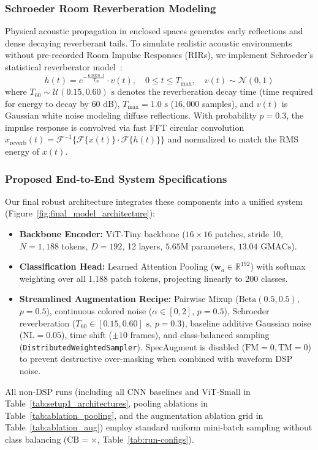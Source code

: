 \documentclass[11pt,a4paper]{article}
\begin{document}
\subsubsection{Schroeder Room Reverberation Modeling}
Physical acoustic propagation in enclosed spaces generates early reflections and dense decaying reverberant tails. To simulate realistic acoustic environments without pre-recorded Room Impulse Responses (RIRs), we implement Schroeder's statistical reverberator model~\cite{schroeder1962natural}:
\begin{equation}
    h(t) = e^{-\frac{6.9078 \cdot t}{T_{60}}} \cdot v(t), \quad 0 \le t \le T_{\text{max}}, \quad v(t) \sim \mathcal{N}(0, 1)
\end{equation}
where $T_{60} \sim \mathcal{U}(0.15, 0.60)\text{ s}$ denotes the reverberation decay time (time required for energy to decay by $60\text{ dB}$), $T_{\text{max}} = 1.0\text{ s}$ ($16,000$ samples), and $v(t)$ is Gaussian white noise modeling diffuse reflections. With probability $p=0.3$, the impulse response is convolved via fast FFT circular convolution $x_{\text{reverb}}(t) = \mathcal{F}^{-1}\{\mathcal{F}\{x(t)\} \cdot \mathcal{F}\{h(t)\}\}$ and normalized to match the RMS energy of $x(t)$.

\subsubsection{Proposed End-to-End System Specifications}
Our final robust architecture integrates these components into a unified system (Figure~\ref{fig:final_model_architecture}):
\begin{itemize}
    \item \textbf{Backbone Encoder:} ViT-Tiny backbone ($16 \times 16$ patches, stride 10, $N=1,188$ tokens, $D=192$, 12 layers, $5.65\text{M}$ parameters, $13.04\text{ GMACs}$).
    \item \textbf{Classification Head:} Learned Attention Pooling ($\mathbf{w}_a \in \mathbb{R}^{192}$) with softmax weighting over all 1,188 patch tokens, projecting linearly to 200 classes.
    \item \textbf{Streamlined Augmentation Recipe:} Pairwise Mixup ($\text{Beta}(0.5, 0.5)$, $p=0.5$), continuous colored noise ($\alpha \in [0, 2]$, $p=0.5$), Schroeder reverberation ($T_{60} \in [0.15, 0.60]\text{ s}$, $p=0.3$), baseline additive Gaussian noise ($\text{NL}=0.05$), time shift ($\pm 10$ frames), and class-balanced sampling (\texttt{Distributed}\-\texttt{Weighted}\-\texttt{Sampler}). SpecAugment is disabled ($\text{FM}=0, \text{TM}=0$) to prevent destructive over-masking when combined with waveform DSP noise.
\end{itemize}
All non-DSP runs (including all CNN baselines and ViT-Small in Table~\ref{tab:setup1_architectures}, pooling ablations in Table~\ref{tab:ablation_pooling}, and the augmentation ablation grid in Table~\ref{tab:ablation_aug}) employ standard uniform mini-batch sampling without class balancing ($\text{CB}=\times$, Table~\ref{tab:run-configs}).
\end{document}
